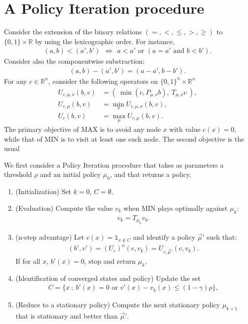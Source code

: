 \documentclass{article}
\def\R{\mathds R}
\def\1{{\mathds 1}}
\begin{document}
\section{A Policy Iteration procedure}

Consider the extension of the binary relations $(=,<,\le,>,\ge)$ to $\{0,1\}\times \R$ by using the lexicographic order. For instance,
\begin{align}
  (a,b) < (a',b') ~~\Leftrightarrow~~ a<a' \mbox{ or }(a=a' \mbox{ and }b<b').
\end{align}
Consider also the componentwise substraction:
\begin{align}
  (a,b) - (a',b') = (a-a',b-b').
\end{align}
For any $c \in \R^n$, consider the following operators on $\{0,1\}^n \times \R^n$
\begin{align}
  U_{c,\mu,\nu} (b,v) &= (~ \min(c, P_{\mu,\nu}b),~ T_{\mu,\nu}v ~),\\
  U_{c,\mu} (b,v) & = \min_{\nu} U_{c,\mu,\nu}(b,v), \\
  U_c(b,v) & = \max_{\mu} U_{c,\mu} (b,v).
\end{align}
The primary objective of MAX is to avoid any node $x$ with value $c(x)=0$, while that of MIN is to visit at least one such node. The second objective is the usual 


We first consider a Policy Iteration procedure that takes as parameters a threshold $\rho$ and an initial policy $\mu_0$, and that returns a policy.
  \begin{enumerate}
  \item (Initialization) Set $k=0$, $C=\emptyset$.
  \item (Evaluation) Compute the value $v_k$ when MIN plays optimally against $\mu_k$:
    \begin{align}
      v_k = T_{\mu_k} v_k.
    \end{align}
  \item (n-step advantage) Let $c(x)=\1_{x \not\in C}$ and identify a policy $\vec\mu'$ such that:
    \begin{align}
      (b', v') = (U_c)^n (c,v_k) = U_{c,\vec\mu'} (c,v_k).
    \end{align}
    If for all $x$, $b'(x)=0$, stop and return $\mu_k$.
  \item (Identification of converged states and policy) Update the set
      \begin{align}
        C = \{ x ~;~ b'(x)=0 \mbox{ or }v'(x)-v_k(x) \le (1-\gamma)\rho \},
      \end{align}
    \item (Reduce to a stationary policy) Compute the next stationary policy $\mu_{k+1}$ that is stationary and better than $\vec\mu'$.
  \end{enumerate}
\end{document}
